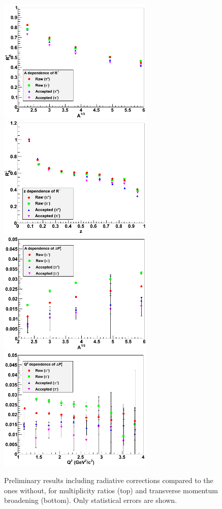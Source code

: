 \begin{figure}[tbp]
\centering
\includegraphics[width=7.4cm] {chap5-fig/b_RvA.png} 
\includegraphics[width=7.4cm] {chap5-fig/b_RvZ.png} 
\includegraphics[width=7.4cm] {chap5-fig/b_PvA.png} 
\includegraphics[width=7.4cm] {chap5-fig/b_PvQ2.png} 
\caption {Preliminary results including radiative corrections
compared to the ones without, 
for multiplicity ratios (top) and transverse momentum broadening 
(bottom). Only statistical errors are shown.}
\label{fig:RCPlots}
\end{figure}

